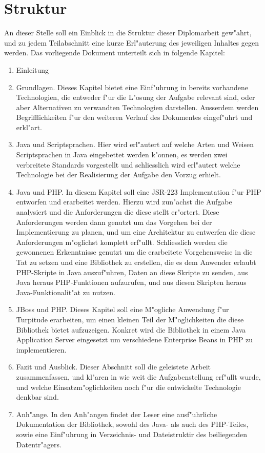 \clearpage

\section{Struktur}
\label{sec:intro:structure}

An dieser Stelle soll ein Einblick in die Struktur dieser Diplomarbeit gew"ahrt, und zu jedem Teilabschnitt eine
kurze Erl"auterung des jeweiligen Inhaltes gegen werden.
Das vorliegende Dokument unterteilt sich in folgende Kapitel:

\begin{enumerate}
    \item Einleitung
    \item Grundlagen. Dieses Kapitel bietet eine Einf"uhrung in bereits vorhandene Technologien, die entweder
    f"ur die L"osung der Aufgabe relevant sind, oder aber Alternativen zu verwandten Technologien darstellen.
    Ausserdem werden Begrifflichkeiten f"ur den weiteren Verlauf des Dokumentes eingef"uhrt und erkl"art.
    \item Java und Scriptsprachen. Hier wird erl"autert auf welche Arten und Weisen Scriptsprachen in Java
    eingebettet werden k"onnen, es werden zwei verbreitete Standards vorgestellt und schliesslich wird
    erl"autert welche Technologie bei der Realisierung der Aufgabe den Vorzug erhielt.
    \item Java und PHP. In diesem Kapitel soll eine JSR-223 Implementation f"ur PHP entworfen und erarbeitet werden. Hierzu wird zun"achst
    die Aufgabe analysiert und die Anforderungen die diese stellt er"ortert. Diese Anforderungen werden dann genutzt
    um das Vorgehen bei der Implementierung zu planen, und um eine Architektur zu entwerfen die diese Anforderungen
    m"oglichst komplett erf"ullt. Schliesslich werden die gewonnenen Erkenntnisse genutzt um die erarbeitete Vorgehensweise
    in die Tat zu setzen und eine Bibliothek zu erstellen, die es dem Anwender erlaubt PHP-Skripte in Java auszuf"uhren,
    Daten an diese Skripte zu senden, aus Java heraus PHP-Funktionen aufzurufen, und aus diesen Skripten heraus 
    Java-Funktionalit"at zu nutzen.
    \item JBoss und PHP. Dieses Kapitel soll eine M"ogliche Anwendung f"ur Turpitude erarbeiten, 
    um einen kleinen Teil der M"oglichkeiten die diese Bibliothek bietet aufzuzeigen. Konkret wird die Bibliothek
    in einem Java Application Server eingesetzt um verschiedene Enterprise Beans in PHP zu implementieren.
    \item Fazit und Ausblick. Dieser Abschnitt soll die geleistete Arbeit zusammenfassen, und
    kl"aren in wie weit die Aufgabenstellung erf"ullt wurde,
    und welche Einsatzm"oglichkeiten noch f"ur die entwickelte Technologie denkbar sind.
    \item Anh"ange. In den Anh"angen findet der Leser eine ausf"uhrliche Dokumentation der Bibliothek, sowohl des
    Java- als auch des PHP-Teiles, sowie eine Einf"uhrung in Verzeichnis- und Dateistruktir des beiliegenden
    Datentr"agers.
\end{enumerate}


